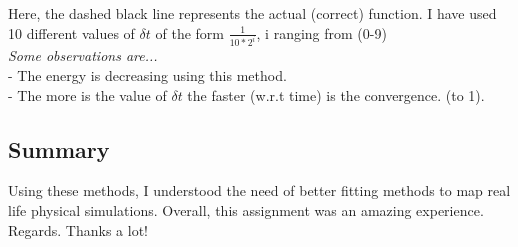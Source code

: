 \documentclass{article}
\begin{document}
        Here, the dashed black line represents the actual (correct) function. I have used 10 different values of \(\delta t\) of the form \(\frac{1}{10 * 2^i}\), i ranging from (0-9) \\[20pt]
        \textit{Some observations are...} \\
             - The energy is decreasing using this method. \\
             - The more is the value of \(\delta t\) the faster (w.r.t time) is the convergence. (to 1).


    \subsection*{Summary}
    Using these methods, I understood the need of better fitting methods to map real life physical simulations. Overall, this assignment was an amazing experience. Regards. Thanks a lot!
\end{document}

